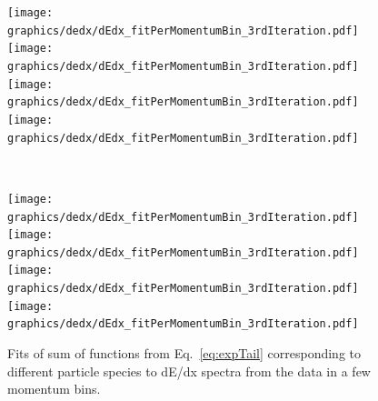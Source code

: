\begin{figure}[hb]
\centering
\parbox{0.495\textwidth}{
  \centering
  \texttt{[image: graphics/dedx/dEdx\_fitPerMomentumBin\_3rdIteration.pdf]}\\
  \texttt{[image: graphics/dedx/dEdx\_fitPerMomentumBin\_3rdIteration.pdf]}\\
  \texttt{[image: graphics/dedx/dEdx\_fitPerMomentumBin\_3rdIteration.pdf]}\\
  \texttt{[image: graphics/dedx/dEdx\_fitPerMomentumBin\_3rdIteration.pdf]}
}~
\parbox{0.495\textwidth}{
  \centering
  \texttt{[image: graphics/dedx/dEdx\_fitPerMomentumBin\_3rdIteration.pdf]}\\
  \texttt{[image: graphics/dedx/dEdx\_fitPerMomentumBin\_3rdIteration.pdf]}\\
  \texttt{[image: graphics/dedx/dEdx\_fitPerMomentumBin\_3rdIteration.pdf]}\\
  \texttt{[image: graphics/dedx/dEdx\_fitPerMomentumBin\_3rdIteration.pdf]}
}%
\caption[Fits to dE/dx spectra from the data.]{Fits of sum of functions from Eq.~\eqref{eq:expTail} corresponding to different particle species to dE/dx spectra from the data in a few momentum bins.}\label{fig:dEdxFits}
\end{figure}



